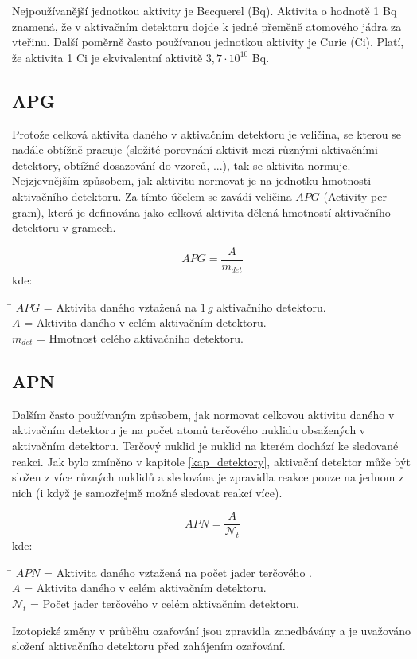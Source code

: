 Nejpoužívanější jednotkou aktivity je Becquerel (Bq). Aktivita o hodnotě 1 Bq znamená, že v aktivačním detektoru dojde k jedné přeměně atomového jádra za vteřinu. Další poměrně často používanou jednotkou aktivity je Curie (Ci). Platí, že aktivita 1 Ci je ekvivalentní aktivitě $3,7 \cdot 10^{10}$ Bq.

\subsection{APG}
Protože celková aktivita daného  v aktivačním detektoru je veličina, se kterou se nadále obtížně pracuje (složité porovnání aktivit mezi různými aktivačními detektory, obtížné dosazování do vzorců, ...), tak se aktivita normuje. Nejzjevnějším způsobem, jak aktivitu normovat je na jednotku hmotnosti aktivačního detektoru. Za tímto účelem se zavádí veličina $APG$ (Activity per  gram), která je definována jako celková aktivita dělená hmotností aktivačního detektoru v gramech.

\begin{equation}
    \label{rov303}
    APG = \frac{A}{m_{det}}
\end{equation}
kde:
\begin{tabbing}
    \hspace{1.0cm} \= \kill
    $APG$\> = Aktivita daného  vztažená na $1\,g$ aktivačního detektoru. \\
    $A$\> = Aktivita daného  v celém aktivačním detektoru. \\
    $m_{det}$\> = Hmotnost celého aktivačního detektoru. \\
\end{tabbing}

\subsection{APN}
Dalším často používaným způsobem, jak normovat celkovou aktivitu daného  v aktivačním detektoru je na počet atomů terčového nuklidu obsažených v aktivačním detektoru. Terčový nuklid je nuklid na kterém dochází ke sledované reakci. Jak bylo zmíněno v kapitole \ref{kap_detektory}, aktivační detektor může být složen z více různých nuklidů a sledována je zpravidla reakce pouze na jednom z nich (i když je samozřejmě možné sledovat reakcí více).

\begin{equation}
    \label{rov304}
    APN = \frac{A}{\mathcal{N}_{t}}
\end{equation}
kde:
\begin{tabbing}
    \hspace{1.0cm} \= \kill
    $APN$\> = Aktivita daného  vztažená na počet jader terčového . \\
    $A$\> = Aktivita daného  v celém aktivačním detektoru. \\
    $\mathcal{N}_{t}$\> = Počet jader terčového  v celém aktivačním detektoru. \\
\end{tabbing}

Izotopické změny v průběhu ozařování jsou zpravidla zanedbávány a je uvažováno složení aktivačního detektoru před zahájením ozařování.